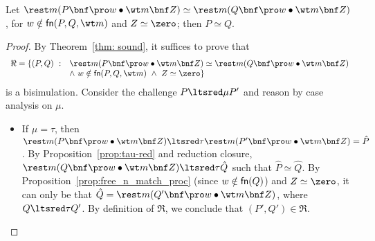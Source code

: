 \documentclass{LMCS}
\renewcommand{\beq}{\simeq}
\begin{document}
\begin{lem}
\label{lem:succ-beq}
Let $\rest m(P\bnf\pro w\bullet\wt m \bnf Z) \beq \rest m(Q\bnf\pro w\bullet\wt m \bnf Z)$, 
for $w\notin{\sf fn}(P,Q,\wt m)$ and $Z \beq \zero$; then $P\beq Q$.
\end{lem}
\begin{proof}
By Theorem~\ref{thm: sound}, it suffices to prove that
$$
\begin{array}{ll}
\Re = \{(P,Q)\ : & \rest m(P\bnf\pro w\bullet\wt m \bnf Z) \beq \rest m(Q\bnf\pro w\bullet\wt m \bnf Z)
\\
& \wedge\ w\notin{\sf fn}(P,Q,\wt m)\ \wedge\ Z \beq \zero\}
\end{array}
$$
is a bisimulation. Consider the challenge $P \ltsred\mu P'$ and reason by case analysis on $\mu$.
\begin{itemize}
\item If $\mu = \tau$, then $\rest m(P\bnf\pro w\bullet\wt m \bnf Z) \ltsred\tau 
\rest m(P'\bnf\pro w\bullet\wt m \bnf Z) = \hat P$.
By Proposition~\ref{prop:tau-red} and reduction closure, 
$\rest m(Q\bnf\pro w\bullet\wt m \bnf Z) \ltsred\tau \hat Q$ such that $\hat P \beq \hat Q$.
By Proposition~\ref{prop:free_n_match_proc} (since $w \notin {\sf fn}(Q)$) and $Z \beq \zero$, it can only be that
$\hat Q = \rest m(Q'\bnf\pro w\bullet\wt m \bnf Z)$, where $Q \ltsred\tau Q'$.
By definition of $\Re$, we conclude that $(P',Q') \in \Re$.


\end{itemize}
\end{proof}
\end{document}
